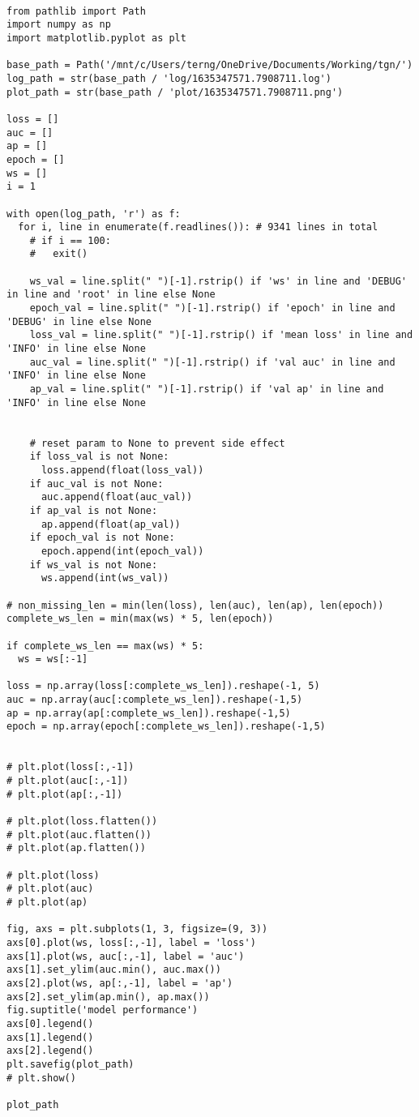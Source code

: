 \documentclass[11pt]{article}
\begin{document}
\begin{verbatim}

from pathlib import Path
import numpy as np
import matplotlib.pyplot as plt

base_path = Path('/mnt/c/Users/terng/OneDrive/Documents/Working/tgn/')
log_path = str(base_path / 'log/1635347571.7908711.log')
plot_path = str(base_path / 'plot/1635347571.7908711.png')

loss = []
auc = []
ap = []
epoch = []
ws = []
i = 1

with open(log_path, 'r') as f:
  for i, line in enumerate(f.readlines()): # 9341 lines in total
    # if i == 100:
    #   exit()

    ws_val = line.split(" ")[-1].rstrip() if 'ws' in line and 'DEBUG' in line and 'root' in line else None
    epoch_val = line.split(" ")[-1].rstrip() if 'epoch' in line and 'DEBUG' in line else None
    loss_val = line.split(" ")[-1].rstrip() if 'mean loss' in line and 'INFO' in line else None
    auc_val = line.split(" ")[-1].rstrip() if 'val auc' in line and 'INFO' in line else None
    ap_val = line.split(" ")[-1].rstrip() if 'val ap' in line and 'INFO' in line else None


    # reset param to None to prevent side effect
    if loss_val is not None:
      loss.append(float(loss_val))
    if auc_val is not None:
      auc.append(float(auc_val))
    if ap_val is not None:
      ap.append(float(ap_val))
    if epoch_val is not None:
      epoch.append(int(epoch_val))
    if ws_val is not None:
      ws.append(int(ws_val))

# non_missing_len = min(len(loss), len(auc), len(ap), len(epoch))
complete_ws_len = min(max(ws) * 5, len(epoch))

if complete_ws_len == max(ws) * 5:
  ws = ws[:-1]

loss = np.array(loss[:complete_ws_len]).reshape(-1, 5)
auc = np.array(auc[:complete_ws_len]).reshape(-1,5)
ap = np.array(ap[:complete_ws_len]).reshape(-1,5)
epoch = np.array(epoch[:complete_ws_len]).reshape(-1,5)


# plt.plot(loss[:,-1])
# plt.plot(auc[:,-1])
# plt.plot(ap[:,-1])

# plt.plot(loss.flatten())
# plt.plot(auc.flatten())
# plt.plot(ap.flatten())

# plt.plot(loss)
# plt.plot(auc)
# plt.plot(ap)

fig, axs = plt.subplots(1, 3, figsize=(9, 3))
axs[0].plot(ws, loss[:,-1], label = 'loss')
axs[1].plot(ws, auc[:,-1], label = 'auc')
axs[1].set_ylim(auc.min(), auc.max())
axs[2].plot(ws, ap[:,-1], label = 'ap')
axs[2].set_ylim(ap.min(), ap.max())
fig.suptitle('model performance')
axs[0].legend()
axs[1].legend()
axs[2].legend()
plt.savefig(plot_path)
# plt.show()

plot_path
\end{verbatim}
\end{document}
